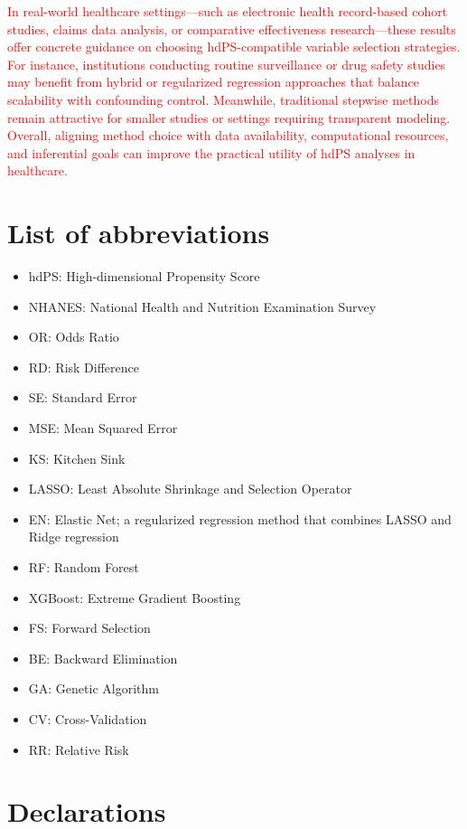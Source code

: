 \documentclass[10pt,letterpaper]{article}
\providecommand{\tightlist}{%
  \setlength{\itemsep}{0pt}\setlength{\parskip}{0pt}}
\begin{document}
\textcolor{red}{In real-world healthcare settings—such as electronic health record-based cohort studies, claims data analysis, or comparative effectiveness research—these results offer concrete guidance on choosing hdPS-compatible variable selection strategies. For instance, institutions conducting routine surveillance or drug safety studies may benefit from hybrid or regularized regression approaches that balance scalability with confounding control. Meanwhile, traditional stepwise methods remain attractive for smaller studies or settings requiring transparent modeling. Overall, aligning method choice with data availability, computational resources, and inferential goals can improve the practical utility of hdPS analyses in healthcare.}

\section*{List of abbreviations}\label{list-of-abbreviations}

\begin{itemize}
\tightlist
\item
  hdPS: High-dimensional Propensity Score
\item
  NHANES: National Health and Nutrition Examination Survey
\item
  OR: Odds Ratio
\item
  RD: Risk Difference
\item
  SE: Standard Error
\item
  MSE: Mean Squared Error
\item
  KS: Kitchen Sink
\item
  LASSO: Least Absolute Shrinkage and Selection Operator
\item
  EN: Elastic Net; a regularized regression method that combines LASSO
  and Ridge regression
\item
  RF: Random Forest
\item
  XGBoost: Extreme Gradient Boosting
\item
  FS: Forward Selection
\item
  BE: Backward Elimination
\item
  GA: Genetic Algorithm
\item
  CV: Cross-Validation
\item
  RR: Relative Risk
\end{itemize}

\section*{Declarations}\label{declarations}
\end{document}
